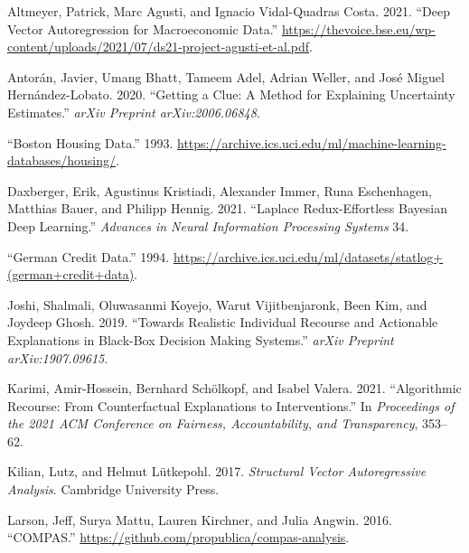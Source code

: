 \documentclass[
]{acmconf}
\newlength{\cslhangindent}
\newlength{\cslentryspacingunit} %
\newenvironment{CSLReferences}[2] %
 {%
  \setlength{\parindent}{0pt}
  \ifodd #1
  \let\oldpar\par
  \def\par{\hangindent=\cslhangindent\oldpar}
  \fi
  \setlength{\parskip}{#2\cslentryspacingunit}
 }%
 {}
\begin{document}
\hypertarget{refs}{}
\begin{CSLReferences}{1}{0}
\leavevmode{}%
Altmeyer, Patrick, Marc Agusti, and Ignacio Vidal-Quadras Costa. 2021.
{``Deep Vector Autoregression for Macroeconomic Data.''}
\url{https://thevoice.bse.eu/wp-content/uploads/2021/07/ds21-project-agusti-et-al.pdf}.

\leavevmode{}%
Antorán, Javier, Umang Bhatt, Tameem Adel, Adrian Weller, and José
Miguel Hernández-Lobato. 2020. {``Getting a Clue: A Method for
Explaining Uncertainty Estimates.''} \emph{arXiv Preprint
arXiv:2006.06848}.

\leavevmode{}%
{``Boston Housing Data.''} 1993.
\url{https://archive.ics.uci.edu/ml/machine-learning-databases/housing/}.

\leavevmode{}%
Daxberger, Erik, Agustinus Kristiadi, Alexander Immer, Runa Eschenhagen,
Matthias Bauer, and Philipp Hennig. 2021. {``Laplace Redux-Effortless
Bayesian Deep Learning.''} \emph{Advances in Neural Information
Processing Systems} 34.

\leavevmode{}%
{``German Credit Data.''} 1994.
\url{https://archive.ics.uci.edu/ml/datasets/statlog+(german+credit+data)}.

\leavevmode{}%
Joshi, Shalmali, Oluwasanmi Koyejo, Warut Vijitbenjaronk, Been Kim, and
Joydeep Ghosh. 2019. {``Towards Realistic Individual Recourse and
Actionable Explanations in Black-Box Decision Making Systems.''}
\emph{arXiv Preprint arXiv:1907.09615}.

\leavevmode{}%
Karimi, Amir-Hossein, Bernhard Schölkopf, and Isabel Valera. 2021.
{``Algorithmic Recourse: From Counterfactual Explanations to
Interventions.''} In \emph{Proceedings of the 2021 ACM Conference on
Fairness, Accountability, and Transparency}, 353--62.

\leavevmode{}%
Kilian, Lutz, and Helmut Lütkepohl. 2017. \emph{Structural Vector
Autoregressive Analysis}. Cambridge University Press.

\leavevmode{}%
Larson, Jeff, Surya Mattu, Lauren Kirchner, and Julia Angwin. 2016.
{``COMPAS.''} \url{https://github.com/propublica/compas-analysis}.


\end{CSLReferences}
\end{document}
